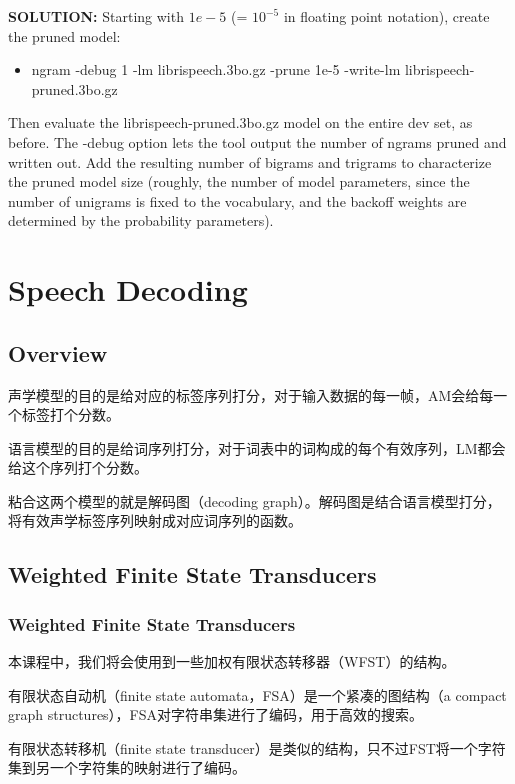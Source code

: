 {\bf SOLUTION:} Starting with $1e-5$ (= $10^{-5}$ in floating point notation), create the pruned model:
\begin{itemize}
	\item ngram -debug 1 -lm librispeech.3bo.gz -prune 1e-5 -write-lm librispeech-pruned.3bo.gz
\end{itemize}

Then evaluate the librispeech-pruned.3bo.gz model on the entire dev set, as before. The -debug option lets the tool output the number of ngrams pruned and written out. Add the resulting number of bigrams and trigrams to characterize the pruned model size (roughly, the number of model parameters, since the number of unigrams is fixed to the vocabulary, and the backoff weights are determined by the probability parameters).

\section{Speech Decoding}
\subsection{Overview}
声学模型的目的是给对应的标签序列打分，对于输入数据的每一帧，AM会给每一个标签打个分数。

语言模型的目的是给词序列打分，对于词表中的词构成的每个有效序列，LM都会给这个序列打个分数。

粘合这两个模型的就是解码图（decoding graph）。解码图是结合语言模型打分，将有效声学标签序列映射成对应词序列的函数。
\subsection{Weighted Finite State Transducers}
\label{sub:wfst}
\subsubsection{Weighted Finite State Transducers}
本课程中，我们将会使用到一些加权有限状态转移器（WFST）的结构。

有限状态自动机（finite state automata，FSA）是一个紧凑的图结构（a compact graph structures），FSA对字符串集进行了编码，用于高效的搜索。

有限状态转移机（finite state transducer）是类似的结构，只不过FST将一个字符集到另一个字符集的映射进行了编码。

